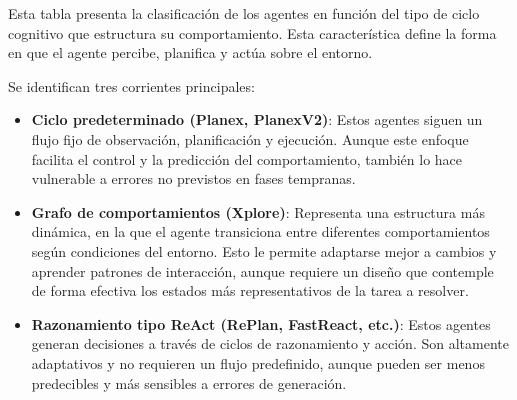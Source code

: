 Esta tabla presenta la clasificación de los agentes en función del tipo de ciclo
cognitivo que estructura su comportamiento. Esta característica define la forma
en que el agente percibe, planifica y actúa sobre el entorno.

Se identifican tres corrientes principales:

\begin{itemize}
  \item \textbf{Ciclo predeterminado (Planex, PlanexV2)}: Estos
  agentes siguen un flujo fijo de observación, planificación y ejecución. Aunque
  este enfoque facilita el control y la predicción del comportamiento, también lo
  hace vulnerable a errores no previstos en fases tempranas.

  \item \textbf{Grafo de comportamientos (Xplore)}: Representa una estructura más
  dinámica, en la que el agente transiciona entre diferentes comportamientos según
  condiciones del entorno. Esto le permite adaptarse mejor a cambios y aprender
  patrones de interacción, aunque requiere un diseño que contemple de forma efectiva
  los estados más representativos de la tarea a resolver.

  \item \textbf{Razonamiento tipo ReAct (RePlan, FastReact, etc.)}: Estos agentes generan decisiones a través de ciclos de
  razonamiento y acción. Son altamente adaptativos y no requieren un flujo
  predefinido, aunque pueden ser menos predecibles y más sensibles a errores de
  generación.
\end{itemize}


